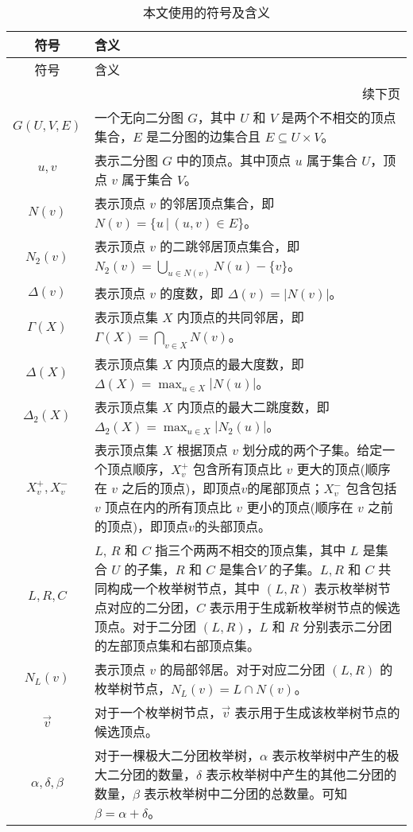 \begin{longtable}[htbp]{|c|p{12cm}|}
    \caption{本文使用的符号及含义}
    \label{tab:definition} \\
    
    \hline
    符号 & 含义 \\ \hline
    \endfirsthead
    
    \hline
    符号 & 含义 \\ \hline
    \endhead
    
    \hline
    \multicolumn{2}{r}{续下页} \\
    \endfoot
    
    \hline
    \endlastfoot
    
    $G(U,V,E)$ & 一个无向二分图 $G$，其中 $U$ 和 $V$ 是两个不相交的顶点集合，$E$ 是二分图的边集合且 $E \subseteq U \times V$。 \\ \hline
    $u,v$ & 表示二分图 $G$ 中的顶点。其中顶点 $u$ 属于集合 $U$，顶点 $v$ 属于集合 $V$。 \\ \hline
    $N(v)$ & 表示顶点 $v$ 的邻居顶点集合，即 $N(v) = \{u \,|\, (u,v) \in E\}$。 \\ \hline
    $N_2(v)$ & 表示顶点 $v$ 的二跳邻居顶点集合，即 $N_2(v) = \bigcup_{u \in N(v)} N(u) - \{v\}$。 \\ \hline
    $\Delta(v)$ & 表示顶点 $v$ 的度数，即 $\Delta(v) = |N(v)|$。 \\ \hline
    $\Gamma(X)$ & 表示顶点集 $X$ 内顶点的共同邻居，即 $\Gamma(X) = \bigcap_{v \in X} N(v)$。 \\ \hline
    $\Delta(X)$ & 表示顶点集 $X$ 内顶点的最大度数，即 $\Delta(X) = \max_{u \in X} |N(u)|$。 \\ \hline
    $\Delta_2(X)$ & 表示顶点集 $X$ 内顶点的最大二跳度数，即 $\Delta_2(X) = \max_{u \in X} |N_2(u)|$。 \\ \hline
    $X_v^+, X_v^-$ & 表示顶点集 $X$ 根据顶点 $v$ 划分成的两个子集。给定一个顶点顺序，$X_v^+$ 包含所有顶点比 $v$ 更大的顶点(顺序在 $v$ 之后的顶点)，即顶点$v$的尾部顶点；$X_v^-$ 包含包括 $v$ 顶点在内的所有顶点比 $v$ 更小的顶点(顺序在 $v$ 之前的顶点)，即顶点$v$的头部顶点。 \\ \hline
    $L,R,C$ & $L$, $R$ 和 $C$ 指三个两两不相交的顶点集，其中 $L$ 是集合 $U$ 的子集，$R$ 和 $C$ 是集合$V$ 的子集。$L,R$ 和 $C$ 共同构成一个枚举树节点，其中 $(L,R)$ 表示枚举树节点对应的二分团，$C$ 表示用于生成新枚举树节点的候选顶点。对于二分团 $(L,R)$，$L$ 和 $R$ 分别表示二分团的左部顶点集和右部顶点集。 \\ \hline
    $N_L(v)$ & 表示顶点 $v$ 的局部邻居。对于对应二分团 $(L,R)$ 的枚举树节点，$N_L(v) = L \cap N(v)$。 \\ \hline
    $\vec{v}$ & 对于一个枚举树节点，$\vec{v}$ 表示用于生成该枚举树节点的候选顶点。 \\ \hline
    $\alpha, \delta, \beta$ & 对于一棵极大二分团枚举树，$\alpha$ 表示枚举树中产生的极大二分团的数量，$\delta$ 表示枚举树中产生的其他二分团的数量，$\beta$ 表示枚举树中二分团的总数量。可知 $\beta = \alpha + \delta$。 \\ \hline
\end{longtable}

